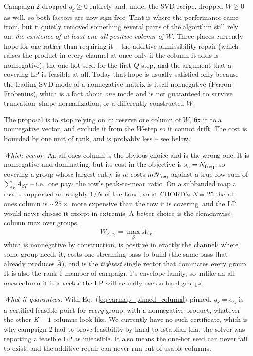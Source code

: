 \documentclass{article}
\numberwithin{equation}{section}   %
\begin{document}
\begin{itemize}
 Campaign 2 dropped $q_\beta \ge 0$ entirely and, under the SVD recipe, dropped $W \ge 0$ as
 well, so both factors are now sign-free. That is where the performance came from, but it
 quietly removed something several parts of the algorithm still rely on: {\em the existence of
 at least one all-positive column of $W$}. Three places currently hope for one rather than
 requiring it -- the additive admissibility repair (which raises the product in every channel at
 once only if the column it adds is nonnegative), the one-hot seed for the first $Q$-step, and
 the argument that a covering LP is feasible at all. Today that hope is usually satisfied only
 because the leading SVD mode of a nonnegative matrix is itself nonnegative (Perron--Frobenius),
 which is a fact about {\em one} mode and is not guaranteed to survive truncation, shape
 normalization, or a differently-constructed $W$.

 The proposal is to stop relying on it: reserve one column of $W$, fix it to a nonnegative
 vector, and exclude it from the $W$-step so it cannot drift. The cost is bounded by one unit of
 rank, and is probably less -- see below.

 {\em Which vector.} An all-ones column is the obvious choice and is the wrong one. It is
 nonnegative and dominating, but its cost in the objective is $s_c = N_{\rm freq}$, so covering
 a group whose largest entry is $m$ costs $m N_{\rm freq}$ against a true row sum of
 $\sum_F \bar A_{\beta F}$ -- i.e.\ one pays the row's peak-to-mean ratio. On a subbanded map a
 row is supported on roughly $1/N$ of the band, so at CHORD's $N = 25$ the all-ones column is
 $\sim 25\times$ more expensive than the row it is covering, and the LP would never choose it
 except in extremis. A better choice is the elementwise column max over groups,
 \begin{equation}
 W_{F,c_0} = \max_\beta \bar A_{\beta F}
 \label{eq:varmap_pinned_column}
 \end{equation}
 which is nonnegative by construction, is positive in exactly the channels where some group
 needs it, costs one streaming pass to build (the same pass that already produces $\bar A$), and
 is the {\em tightest} single vector that dominates every group. It is also the rank-1 member of
 campaign 1's envelope family, so unlike an all-ones column it is a vector the LP will actually
 use on hard groups.

 {\em What it guarantees.} With Eq.\ (\ref{eq:varmap_pinned_column}) pinned, $q_\beta = e_{c_0}$
 is a certified feasible point for {\em every} group, with a nonnegative product, whatever the
 other $K-1$ columns look like. We currently have no such certificate, which is why campaign 2
 had to prove feasibility by hand to establish that the solver was reporting a feasible LP as
 infeasible. It also means the one-hot seed can never fail to exist, and the additive repair can
 never run out of usable columns.


\end{itemize}
\end{document}
